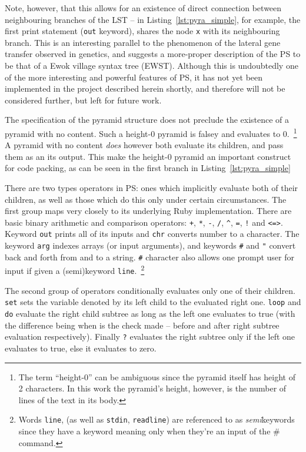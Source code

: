 \documentclass[aip,jcp,reprint,footinbib]{revtex4-1}
\let\tt\texttt
\begin{document}
Note, however, that this allows for an existence of direct connection between neighbouring branches of the LST -- in Listing~\ref{lst:pyra_simple}, for example, the first print statement (\tt{out} keyword), shares the node \tt{x} with its neighbouring branch. This is an interesting parallel to the phenomenon of the lateral gene transfer observed in genetics, and suggests a more-proper description of the PS to be that of a Ewok village syntax tree (EWST).\cite{keeling2008,smbc} Although this is undoubtedly one of the more interesting and powerful features of PS, it has not yet been implemented in the project described herein shortly, and therefore will not be considered further, but left for future work.

The specification of the pyramid structure does not preclude the existence of a pyramid with no content. Such a height-0 pyramid is falsey and evaluates to 0.~\footnote{The term \enquote{height-0} can be ambiguous since the pyramid itself has height of 2 characters. In this work the pyramid's height, however, is the number of lines of the text in its body.}~\cite{psnegation} A pyramid with no content \emph{does} however both evaluate its children, and pass them as an its output. This make the height-0 pyramid an important construct for code packing, as can be seen in the first branch in Listing~\ref{lst:pyra_simple}

There are two types operators in PS: ones which implicitly evaluate both of their children, as well as those which do this only under certain circumstances. The first group maps very closely to its underlying Ruby implementation. There are basic binary arithmetic and comparison operators: \tt{+}, \tt{*}, \tt{-}, \tt{/}, \tt{\^}, \tt{=}, \tt{!} and \tt{<=>}. Keyword \tt{out} prints all of its inputs and \tt{chr} converts number to a character. The keyword \tt{arg} indexes arrays (or input arguments), and keywords \tt{\#} and \tt{"} convert back and forth from and to a string. \tt{\#} character also allows one prompt user for input if given a (semi)keyword \tt{line}.~\footnote{Words \tt{line}, (as well as \tt{stdin}, \tt{readline}) are referenced to as \emph{semi}keywords since they have a keyword meaning only when they're an input of the \# command.}~\cite{pyra_git}

The second group of operators conditionally evaluates only one of their children. \tt{set} sets the variable denoted by its left child to the evaluated right one. \tt{loop} and \tt{do} evaluate the right child subtree as long as the left one evaluates to true (with the difference being when is the check made -- before and after right subtree evaluation respectively). Finally \tt{?} evaluates the right subtree only if the left one evaluates to true, else it evaluates to zero.
\end{document}

